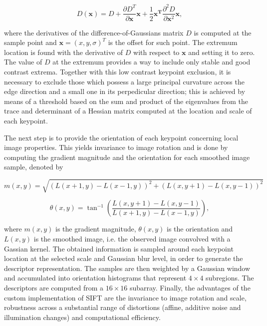 \begin{equation}
\label{eqn:taylor_DoG}
D(\mathbf{x}) = D + 
                \frac{\partial D^{T}}{\partial  \mathbf{x}}\mathbf{x} + \frac{1}{2}\mathbf{x^{T}}\frac{\partial^{2} D}{\partial \mathbf{x}^{2}}\mathbf{x},
\end{equation}

\noindent where the derivatives of the difference-of-Gaussians matrix $D$ is computed at the sample point and $\mathbf{x} = (x,y,\sigma)^{T}$ is the offset for such point. The extremum location is found with the derivative of $D$ with respect to $\mathbf{x}$ and setting it to zero. The value of $D$ at the extremum provides a way to include only stable and good contrast extrema. Together with this low contrast keypoint exclusion, it is necessary to exclude those which possess a large principal curvature across the edge direction and a small one in its perpedicular direction; this is achieved by means of a threshold based on the sum and product of the eigenvalues from the trace and determinant of a Hessian matrix computed at the location and scale of each keypoint.

The next step is to provide the orientation of each keypoint concerning local image properties. This yields invariance to image rotation and is done by computing the gradient magnitude and the orientation for each smoothed image sample, denoted by

\begin{equation}
m(x,y) = \sqrt{(L(x + 1, y) - L(x - 1, y))^{2} + (L(x, y + 1) - L(x, y - 1))^{2}}
\end{equation}

\begin{equation}
\theta(x,y) = \tan^{-1}
			\left(
			\frac{L(x, y + 1) - L(x, y - 1)}
				 {L(x + 1, y) - L(x - 1, y)}
			\right),
\end{equation}

\noindent where $m(x,y)$ is the gradient magnitude, $\theta(x,y)$ is the orientation and $L(x,y)$ is the smoothed image, i.e. the observed image convolved with a Gassian kernel. The obtained information is sampled around each keypoint location at the selected scale and Gaussian blur level, in order to generate the descriptor representation. The samples are then weighted by a Gaussian window and accumulated into orientation histograms that represent $4 \times 4$ subregions. The descriptors are computed from a $16 \times 16$ subarray. Finally, the advantages of the custom implementation of SIFT are the invariance to image rotation and scale, robustness across a substantial range of distortions (affine, additive noise and illumination changes) and computational efficiency.


